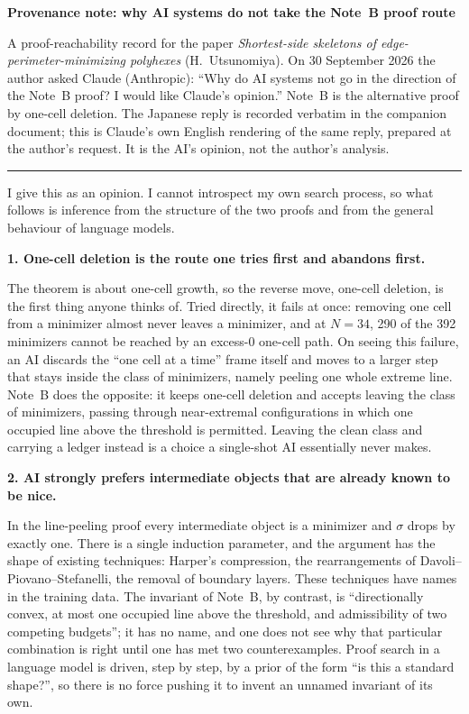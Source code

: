 \documentclass[11pt,a4paper]{article}
\begin{document}
{\Large\bfseries Provenance note: why AI systems do not take the Note~B proof route}

{\small A proof-reachability record for the paper \emph{Shortest-side skeletons of edge-perimeter-minimizing polyhexes} (H.~Utsunomiya).
On 30 September 2026 the author asked Claude (Anthropic): ``Why do AI systems not go in the direction of the Note~B proof? I would like Claude's opinion.'' Note~B is the alternative proof by one-cell deletion. The Japanese reply is recorded verbatim in the companion document; this is Claude's own English rendering of the same reply, prepared at the author's request. It is the AI's opinion, not the author's analysis.}

\bigskip\hrule\bigskip

I give this as an opinion. I cannot introspect my own search process, so what follows is inference from the structure of the two proofs and from the general behaviour of language models.

\textbf{1. One-cell deletion is the route one tries first and abandons first.}

The theorem is about one-cell growth, so the reverse move, one-cell deletion, is the first thing anyone thinks of. Tried directly, it fails at once: removing one cell from a minimizer almost never leaves a minimizer, and at $N=34$, 290 of the 392 minimizers cannot be reached by an excess-0 one-cell path. On seeing this failure, an AI discards the ``one cell at a time'' frame itself and moves to a larger step that stays inside the class of minimizers, namely peeling one whole extreme line. Note~B does the opposite: it keeps one-cell deletion and accepts leaving the class of minimizers, passing through near-extremal configurations in which one occupied line above the threshold is permitted. Leaving the clean class and carrying a ledger instead is a choice a single-shot AI essentially never makes.

\textbf{2. AI strongly prefers intermediate objects that are already known to be nice.}

In the line-peeling proof every intermediate object is a minimizer and $\sigma$ drops by exactly one. There is a single induction parameter, and the argument has the shape of existing techniques: Harper's compression, the rearrangements of Davoli--Piovano--Stefanelli, the removal of boundary layers. These techniques have names in the training data. The invariant of Note~B, by contrast, is ``directionally convex, at most one occupied line above the threshold, and admissibility of two competing budgets''; it has no name, and one does not see why that particular combination is right until one has met two counterexamples. Proof search in a language model is driven, step by step, by a prior of the form ``is this a standard shape?'', so there is no force pushing it to invent an unnamed invariant of its own.
\end{document}
